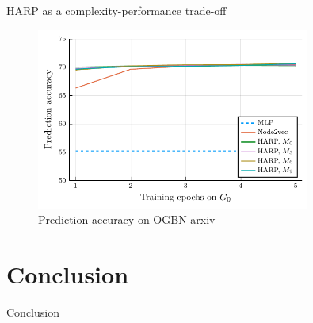 \documentclass[10pt]{beamer}
\begin{document}
\begin{frame}{HARP as a complexity-performance trade-off}
	\begin{figure}
		\centering
		\includegraphics[width=0.8\textwidth]{images/steps_accur/steps_accur.pdf}
		\caption{Prediction accuracy on OGBN-arxiv}
	\end{figure}
\end{frame}

\section{Conclusion}

\begin{frame}{Conclusion}
	\centering
\end{frame}
\end{document}

